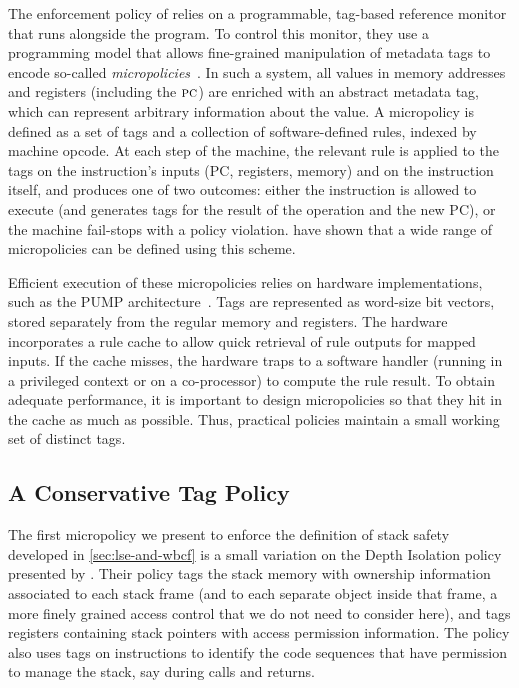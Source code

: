 \documentclass[acmsmall,review,anonymous]{acmart}\settopmatter{printfolios=true,printccs=false,printacmref=false}
\begin{document}
%
The enforcement policy of \citeauthor{DBLP:conf/sp/RoesslerD18} relies
on a programmable, tag-based reference monitor that runs alongside the
program.  To control this monitor, they use a programming model that
allows fine-grained manipulation of metadata tags to encode so-called
\emph{micropolicies}~\citep{pump_oakland2015}.
In such a system, all values in
memory addresses and registers (including the $\textsc{pc}$)
are enriched with an abstract metadata tag, which can represent
arbitrary information about the value. A micropolicy is defined as a set of tags and a
collection of software-defined rules, indexed by machine opcode.
At each step of the machine, the relevant rule is applied to the tags on
the instruction's inputs (PC, registers, memory) and on the instruction itself, and produces
one of two outcomes: either the instruction is allowed to execute (and generates
tags for the result of the operation and the new PC), or the machine
fail-stops with a policy violation.
\citeauthor{pump_oakland2015} have shown that a wide range of micropolicies can
be defined using this scheme.

Efficient execution of these micropolicies relies on hardware implementations,
such as the PUMP architecture~\citep{pump:asplos2015}.  Tags are represented
as word-size bit vectors, stored separately from the regular memory and registers.
The hardware incorporates a rule cache
to allow quick retrieval of rule outputs for mapped inputs. If the cache misses,
the hardware traps to a software handler (running in a privileged context or
on a co-processor) to compute the rule result. To obtain adequate performance,
it is important to design micropolicies so that they hit in the cache as
much as possible. Thus, practical policies maintain a small working set of
distinct tags.

\subsection{A Conservative Tag Policy}
\label{sec:conservative}
%
The first micropolicy we present to enforce the definition of stack
safety developed in \cref{sec:lse-and-wbcf} is a small variation
on the Depth Isolation policy presented by
\citet{DBLP:conf/sp/RoesslerD18}. Their policy tags the stack memory
with ownership information associated to each stack frame (and to each
separate object inside that frame, a more finely grained access
control that we do not need to consider here), and tags registers containing
stack pointers with access permission information. The policy also
uses tags on instructions to identify the code
sequences that have permission to manage the stack, say during calls and returns.
\end{document}
